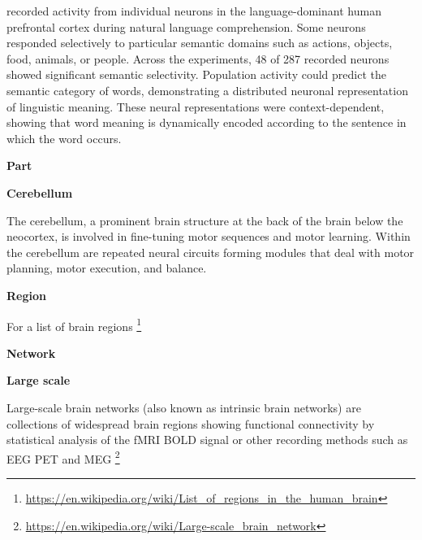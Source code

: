 \documentclass{book}
\providecommand{\ProjectDeepHeading}[2]{%
    \par\medskip\noindent\textbf{#2}\par\smallskip
}
\providecommand{\seeherefooter}[1]{\footnote{\url{#1}}}
\begin{document}
    
    \cite{jamali-2024-semantic-encoding-during-language-comprehension-at-single-cell-resolution} recorded activity from individual neurons in the language-dominant human prefrontal cortex during natural language comprehension. Some neurons responded selectively to particular semantic domains such as actions, objects, food, animals, or people. Across the experiments, 48 of 287 recorded neurons showed significant semantic selectivity. Population activity could predict the semantic category of words, demonstrating a distributed neuronal representation of linguistic meaning. These neural representations were context-dependent, showing that word meaning is dynamically encoded according to the sentence in which the word occurs.

\ProjectDeepHeading{4}{Part}

\ProjectDeepHeading{5}{Cerebellum}


The cerebellum, a prominent brain structure at the back of the brain below
    the neocortex, is involved in fine-tuning motor sequences and motor learning.
    Within the cerebellum are repeated neural circuits forming modules that deal
    with motor planning, motor execution, and balance.

\ProjectDeepHeading{4}{Region}


For a list of brain regions \seeherefooter{https://en.wikipedia.org/wiki/List_of_regions_in_the_human_brain}

\ProjectDeepHeading{5}{Network}

\ProjectDeepHeading{6}{Large scale}


Large-scale brain networks (also known as intrinsic brain networks) are collections of widespread brain regions showing functional connectivity by statistical analysis of the fMRI BOLD signal or other recording methods such as EEG PET and MEG \seeherefooter{https://en.wikipedia.org/wiki/Large-scale_brain_network}
    
\end{document}
